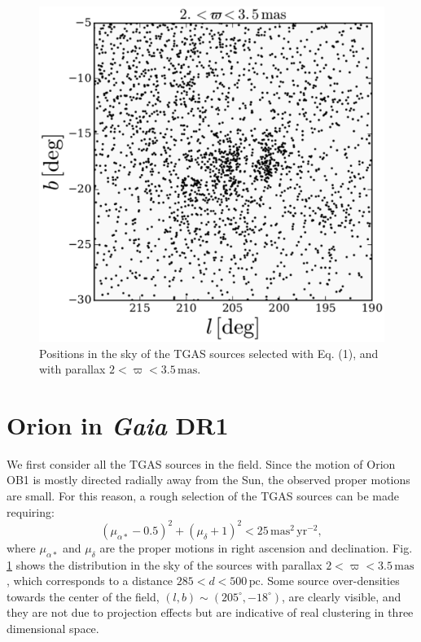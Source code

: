 \documentclass{mem}
\begin{document}
\begin{figure}
\includegraphics[width = \hsize]{fig5a_cut.eps}
\caption{Positions in the sky of the TGAS sources selected with Eq. (1), and with parallax $ 2 < \varpi <3.5 \, \mathrm{mas}$. }
\label{fig1}
\end{figure}


\section{Orion in \textit{Gaia} DR1}
We first consider all the TGAS sources in the field.
Since the  motion of Orion OB1 is mostly directed radially away from the Sun, the observed proper motions are small. For this reason, a rough selection of the TGAS sources can be made requiring:
\begin{equation}\label{eq3}
(\mu_{\alpha*} - 0.5)^2 + (\mu_{\delta}+1)^2 < 25  \,\mathrm{mas^2 \, yr^{-2}},
\end{equation}
where $\mu_{\alpha*}$ and $\mu_{\delta}$ are the proper motions in right ascension and declination. 
Fig. \ref{fig1} shows the distribution  in the sky of the sources  with parallax $2 < \varpi < 3.5 \, \mathrm{mas}$, which corresponds to a distance $285 < d < 500 \, \mathrm{pc}$. 
Some source over-densities towards the center of the field, $(l, b) \sim (205^{\circ}, -18^{\circ})$, are clearly visible, and they are not due to projection effects but are indicative of real clustering in three dimensional space. 
\end{document}

